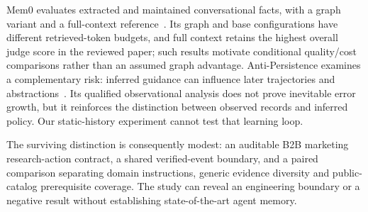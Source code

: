Mem0 evaluates extracted and maintained conversational facts, with a graph variant and a full-context reference~\citep{p250419413}. Its graph and base configurations have different retrieved-token budgets, and full context retains the highest overall judge score in the reviewed paper; such results motivate conditional quality/cost comparisons rather than an assumed graph advantage. Anti-Persistence examines a complementary risk: inferred guidance can influence later trajectories and abstractions~\citep{p261027406}. Its qualified observational analysis does not prove inevitable error growth, but it reinforces the distinction between observed records and inferred policy. Our static-history experiment cannot test that learning loop.

The surviving distinction is consequently modest: an auditable B2B marketing research-action contract, a shared verified-event boundary, and a paired comparison separating domain instructions, generic evidence diversity and public-catalog prerequisite coverage. The study can reveal an engineering boundary or a negative result without establishing state-of-the-art agent memory.

